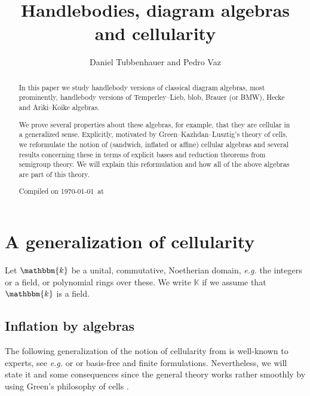 \documentclass[a4paper,11pt]{amsart}
\title[Handlebodies, diagram algebras and cellularity]
{Handlebodies, diagram algebras and cellularity}
\author[Daniel Tubbenhauer and Pedro Vaz]{Daniel Tubbenhauer and Pedro Vaz}
\newcommand{\eg}{\textsl{e.g.}}
\newcommand{\K}{\mathbb{K}}
\newcommand{\KK}{\mathbbm{k}}
\numberwithin{equation}{section}
\renewcommand{\theequation}{\thesection-\arabic{equation}}
\begin{document}
\begin{abstract}
In this paper we study handlebody versions 
of classical diagram algebras, most prominently, 
handlebody versions of Temperley--Lieb, blob, 
Brauer (or BMW), Hecke and Ariki--Koike algebras.

We prove several properties 
about these algebras, for example, that they are cellular 
in a generalized sense.
Explicitly, motivated by Green--Kazhdan--Lusztig's 
theory of cells, we reformulate the notion of 
(sandwich, inflated or affine) cellular algebras 
and several results concerning these in terms of 
explicit bases and reduction theorems 
from semigroup theory.
We will explain this reformulation
and how all of the above algebras 
are part of this theory.

Compiled on \today\ at \currenttime
\end{abstract}

\renewcommand{\theequation}{\thesection-\arabic{equation}}


\maketitle

\tableofcontents




\section{A generalization of cellularity}\label{section:cells}

Let $\KK$ be a unital, commutative, Noetherian domain, {\eg} 
the integers or a field, or polynomial rings over these. 
We write $\K$ if we assume that $\KK$ is a field.

\subsection{Inflation by algebras}\label{subsection:groups-inflation}

The following generalization of the notion 
of cellularity from \cite{GrLe-cellular} is well-known 
to experts, see {\eg} \cite{KoXi-cellular-inflation-morita}
or \cite{GuWi-almost-cellular} or
basis-free and finite formulations.
Nevertheless, we will state it and some consequences 
since the general theory 
works rather smoothly by using 
Green's philosophy of cells \cite{Gr-semigroups}.
\end{document}
